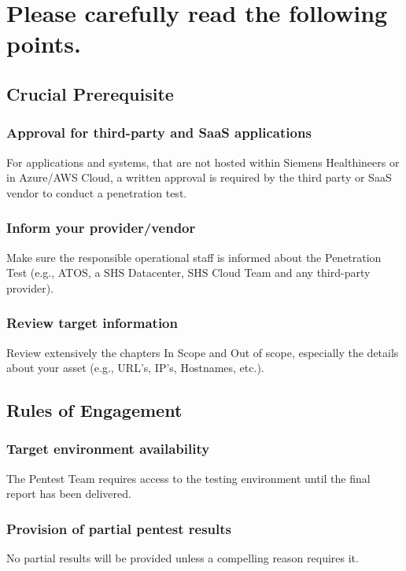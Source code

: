 \chapter*{\color{orange-shs}Please carefully read the following points.}
\vskip 0.3in



\section*{Crucial Prerequisite}
\subsection*{Approval for third-party and SaaS applications}
For applications and systems, that are not hosted within Siemens Healthineers or in Azure/AWS Cloud, a written approval is required by the third party or SaaS vendor to conduct a penetration test.

\subsection*{Inform your provider/vendor}
Make sure the responsible operational staff is informed about the Penetration Test (e.g., ATOS, a SHS Datacenter, SHS Cloud Team and any third-party provider).

\subsection*{Review target information}
Review extensively the chapters In Scope and Out of scope, especially the details about your asset (e.g., URL’s, IP’s, Hostnames, etc.).



\section*{Rules of Engagement}
\subsection*{Target environment availability}
The Pentest Team requires access to the testing environment until the final report has been delivered.

\subsection*{Provision of partial pentest results}
No partial results will be provided unless a compelling reason requires it.

